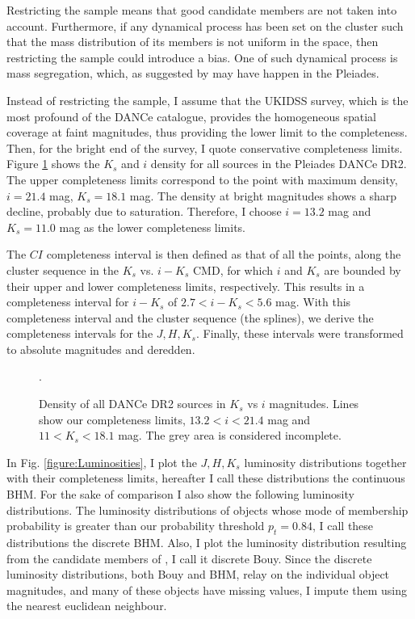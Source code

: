 Restricting the sample means that good candidate members are not taken into account. Furthermore, if any dynamical process has been set on the cluster such that the mass distribution of its members is not uniform in the space, then restricting the sample could introduce a bias. One of such dynamical process is mass segregation, which, as suggested by \citet{Adams2001} may have happen in the Pleiades. 

Instead of restricting the sample, I assume that the UKIDSS survey, which is the most profound of the DANCe catalogue, provides the homogeneous spatial coverage at faint magnitudes, thus providing the lower limit to the completeness. Then, for the bright end of the survey, I quote conservative completeness limits. Figure \ref{figure:completeness} shows the $K_s$ and $i$ density  for all sources in the Pleiades DANCe DR2. The upper completeness limits correspond to the point with maximum density, $i=21.4$ mag, $K_s=18.1$ mag. The density at bright magnitudes shows a sharp decline, probably due to saturation. Therefore, I choose $i=13.2$ mag and $K_s=11.0$ mag as the lower completeness limits.

The $CI$ completeness interval is then defined as that of all the points, along the cluster sequence in the $K_s$ vs. $i-K_s$ CMD, for which $i$ and $K_s$ are bounded by their upper and lower completeness limits, respectively. This results in a completeness interval for $i-K_s$ of  $2.7<i-K_s<5.6$ mag. With this completeness interval and the cluster sequence (the splines), we derive the completeness intervals for the $J,H,K_s$. Finally, these intervals were transformed to absolute magnitudes and deredden. 
\begin{figure}[htbp]
\begin{center}
\caption{Density of all DANCe DR2 sources in $K_s$ vs $i$ magnitudes. Lines show our completeness limits, $13.2<i<21.4$ mag and $11<K_s<18.1$ mag. The grey area is considered incomplete.}
\label{figure:completeness}.
\end{center}
\end{figure}


In Fig. \ref{figure:Luminosities}, I plot the $J,H,K_s$ luminosity distributions together with their completeness limits, hereafter I call these distributions the continuous BHM. For the sake of comparison I also show the following luminosity distributions. The luminosity distributions of objects whose mode of membership probability is greater than our probability threshold $p_t=0.84$, I call these distributions the discrete BHM. Also, I plot the luminosity distribution resulting from the candidate members of \citet{Bouy2015}, I call it discrete Bouy. Since the discrete luminosity distributions, both Bouy and BHM, relay on the individual object magnitudes, and many of these objects have missing values, I impute them using the nearest euclidean neighbour. 

